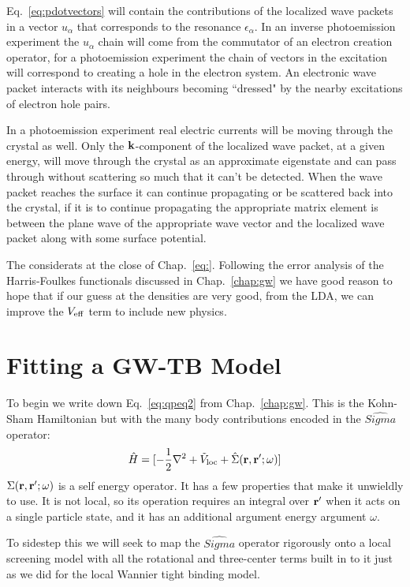 Eq.~\ref{eq:pdotvectors} will contain the contributions of the localized
wave packets in a vector $u_{\alpha}$ that corresponds to the resonance 
$\epsilon_{\alpha}$. In an inverse photoemission experiment the $u_{\alpha}$ chain
will come from the commutator of an electron creation operator, for a photoemission
experiment the chain of vectors in the excitation will correspond to creating a hole
in the electron system. An electronic wave packet interacts with its neighbours becoming
``dressed" by the nearby excitations of electron hole pairs. 

In a photoemission experiment real electric currents will be moving through the crystal as well.
Only the ${\bf k}$-component of the localized wave packet, at a given energy, will move through the crystal as 
an approximate eigenstate and can pass through without scattering so much that it can't be detected.
When the wave packet reaches the surface it can continue propagating
or be scattered back into the crystal, if it is to continue propagating the appropriate matrix element
is between the plane wave of the appropriate wave vector and the localized wave packet along with some
surface potential.

The considerats at the close of Chap.~\ref{eq:}. Following the error analysis of the Harris-Foulkes
functionals discussed in Chap.~\ref{chap:gw} we have good reason to hope 
that if our guess at the densities are very good, from the LDA, we can 
improve the $V_{\rm eff}$ term to include new physics.

\section{Fitting a GW-TB Model}
To begin we write down Eq.~\ref{eq:qpeq2} from Chap.~\ref{chap:gw}.
This is the Kohn-Sham Hamiltonian but with the many body contributions
encoded in the $\hat{Sigma}$ operator:
%
\begin{equation}
\hat{H} = [-\frac{1}{2}\nabla^{2} + \tilde{V}_{\rm loc} + \hat{\Sigma}({\bf r},{\bf r}';\omega)]
\end{equation}
%
$\Sigma({\bf r},{\bf r}';\omega)$ is a self energy operator. It has a few properties
that make it unwieldly to use. It is not local, so its operation requires an integral over
${\bf r}'$ when it acts on a single particle state, and it has an additional argument 
energy argument $\omega$. 

To sidestep this we will seek to map the $\hat{Sigma}$ operator 
rigorously onto a local screening model with all the rotational and
three-center terms built in to it just as we did for the local Wannier 
tight binding model.

